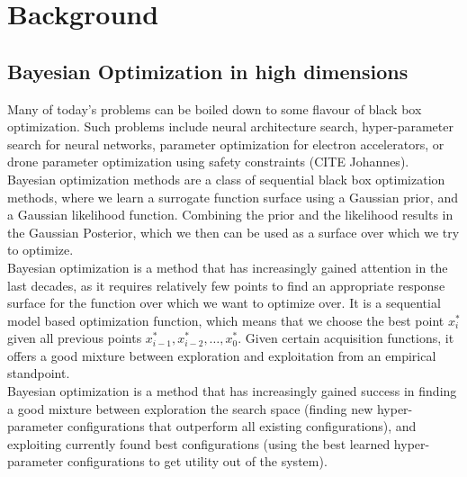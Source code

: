 
\chapter{Background}  %

\ifpdf
    \graphicspath{{Chapter1/Figs/Raster/}{Chapter1/Figs/PDF/}{Chapter1/Figs/}}
\else
    \graphicspath{{Chapter1/Figs/Vector/}{Chapter1/Figs/}}
\fi


\section{Bayesian Optimization in high dimensions} %

Many of today's problems can be boiled down to some flavour of black box optimization. 
Such problems include neural architecture search, hyper-parameter search for neural networks, parameter optimization for electron accelerators, or drone parameter optimization using safety constraints (CITE Johannes). \\

Bayesian optimization methods are a class of sequential black box optimization methods, where we learn a surrogate function surface using a Gaussian prior, and a Gaussian likelihood function.
Combining the prior and the likelihood results in the Gaussian Posterior, which we then can be used as a surface over which we try to optimize. \\

Bayesian optimization is a method that has increasingly gained attention in the last decades, as it requires relatively few points to find an appropriate response surface for the function over which we want to optimize over.
It is a sequential model based optimization function, which means that we choose the best point $x^*_i$ given all previous points $x^*_{i-1}, x^*_{i-2}, \ldots, x^*_{0}$.
Given certain acquisition functions, it offers a good mixture between exploration and exploitation from an empirical standpoint. \\

Bayesian optimization is a method that has increasingly gained success in finding a good mixture between exploration the search space (finding new hyper-parameter configurations that outperform all existing configurations), and exploiting currently found best configurations (using the best learned hyper-parameter configurations to get utility out of the system). \\

